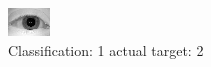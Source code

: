 \begin{figure}[h!]
\begin{center}
\includegraphics[width=0.60\columnwidth]{figures/ID1008_class_1_target_2.png}
\end{center}
\caption{ Classification: 1 actual target: 2}
\label{fig:ID1008_class_1_target_2}
\end{figure}
